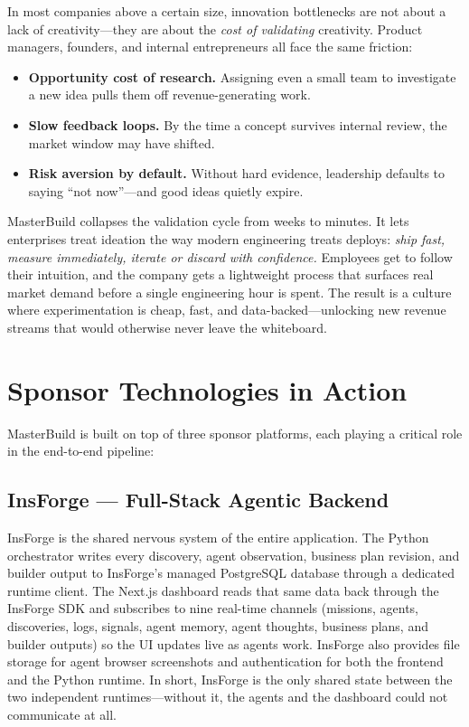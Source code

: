 \documentclass[11pt, letterpaper]{article}
\begin{document}
In most companies above a certain size, innovation bottlenecks are not about a
lack of creativity---they are about the \emph{cost of validating} creativity.
Product managers, founders, and internal entrepreneurs all face the same friction:

\begin{itemize}[nosep]
  \item \textbf{Opportunity cost of research.} Assigning even a small team to
        investigate a new idea pulls them off revenue-generating work.
  \item \textbf{Slow feedback loops.} By the time a concept survives internal
        review, the market window may have shifted.
  \item \textbf{Risk aversion by default.} Without hard evidence, leadership
        defaults to saying ``not now''---and good ideas quietly expire.
\end{itemize}

MasterBuild collapses the validation cycle from weeks to minutes. It lets
enterprises treat ideation the way modern engineering treats deploys:
\emph{ship fast, measure immediately, iterate or discard with confidence.}
Employees get to follow their intuition, and the company gets a lightweight
process that surfaces real market demand before a single engineering hour is
spent. The result is a culture where experimentation is cheap, fast, and
data-backed---unlocking new revenue streams that would otherwise never leave
the whiteboard.

\section{Sponsor Technologies in Action}

MasterBuild is built on top of three sponsor platforms, each playing a
critical role in the end-to-end pipeline:

\subsection{InsForge --- Full-Stack Agentic Backend}
InsForge is the shared nervous system of the entire application. The Python
orchestrator writes every discovery, agent observation, business plan revision,
and builder output to InsForge's managed PostgreSQL database through a dedicated
runtime client. The Next.js dashboard reads that same data back through the
InsForge SDK and subscribes to nine real-time channels (missions, agents,
discoveries, logs, signals, agent memory, agent thoughts, business plans, and
builder outputs) so the UI updates live as agents work. InsForge also provides
file storage for agent browser screenshots and authentication for both the
frontend and the Python runtime. In short, InsForge is the only shared state
between the two independent runtimes---without it, the agents and the dashboard
could not communicate at all.
\end{document}
